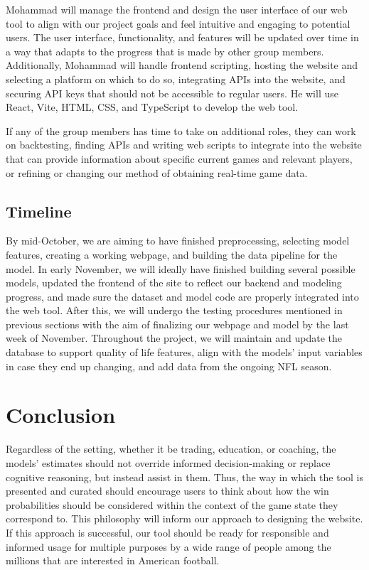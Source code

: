 \documentclass[conference]{IEEEtran}
\begin{document}
Mohammad will manage the frontend and design the user interface of our web tool
to align with our project goals and feel intuitive and engaging to potential
users. The user interface, functionality, and features will be updated over
time in a way that adapts to the progress that is made by other group members.
Additionally, Mohammad will handle frontend scripting, hosting the website and
selecting a platform on which to do so, integrating APIs into the website, and
securing API keys that should not be accessible to regular users. He will use
React, Vite, HTML, CSS, and TypeScript to develop the web tool.

If any of the group members has time to take on additional roles, they can work
on backtesting, finding APIs and writing web scripts to integrate into the
website that can provide information about specific current games and relevant
players, or refining or changing our method of obtaining real-time game data.

\subsection{Timeline}

By mid-October, we are aiming to have finished preprocessing, selecting model
features, creating a working webpage, and building the data pipeline for the
model. In early November, we will ideally have finished building several
possible models, updated the frontend of the site to reflect our backend and
modeling progress, and made sure the dataset and model code are properly
integrated into the web tool. After this, we will undergo the testing
procedures mentioned in previous sections with the aim of finalizing our
webpage and model by the last week of November. Throughout the project, we will
maintain and update the database to support quality of life features, align
with the models' input variables in case they end up changing, and add data
from the ongoing NFL season.

\section{Conclusion}

Regardless of the setting, whether it be trading, education, or coaching, the
models' estimates should not override informed decision-making or replace
cognitive reasoning, but instead assist in them. Thus, the way in which the
tool is presented and curated should encourage users to think about how the win
probabilities should be considered within the context of the game state they
correspond to. This philosophy will inform our approach to designing the
website. If this approach is successful, our tool should be ready for
responsible and informed usage for multiple purposes by a wide range of people
among the millions that are interested in American football.
\end{document}
